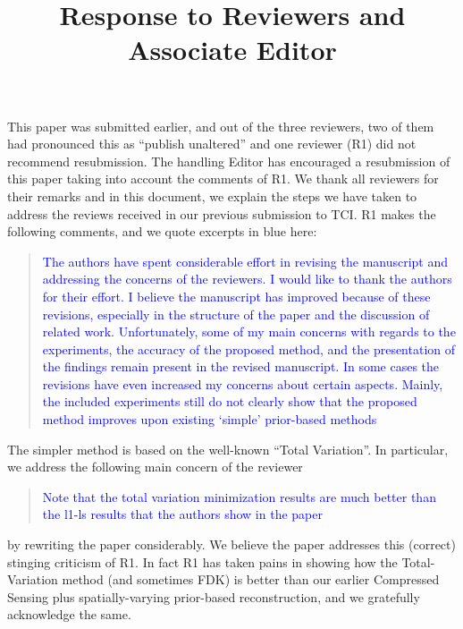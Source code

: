 \documentclass{article}
\title{Response to Reviewers and Associate Editor}
\begin{document}
\date{}
\maketitle

This paper was submitted earlier, and out of the three reviewers, two
of them had pronounced this as ``publish unaltered'' and one reviewer
(R1) did not recommend resubmission. The handling Editor has
encouraged a resubmission of this paper taking into account the
comments of R1.  We thank all reviewers for their remarks and in this
document, we explain the steps we have taken to address the reviews
received in our previous submission to TCI. R1 makes the following
comments, and we quote excerpts in blue here:
\begin{quote}
  \textcolor{blue}{The authors have spent considerable effort in revising the
  manuscript and addressing the concerns of the reviewers. I would
  like to thank the authors for their effort. I believe the manuscript
  has improved because of these revisions, especially in the structure
  of the paper and the discussion of related work. Unfortunately, some
  of my main concerns with regards to the experiments, the accuracy of
  the proposed method, and the presentation of the findings remain
  present in the revised manuscript. In some cases the revisions have
  even increased my concerns about certain aspects. Mainly, the
  included experiments still do not clearly show that the proposed
  method improves upon existing ‘simple’ prior-based methods
  }
  \end{quote}

The simpler method is based on the well-known ``Total Variation''. 
In particular, we address the following main concern of the reviewer 
\begin{quote}  
    \textcolor{blue}{Note that the total
variation minimization results are much better than the l1-ls results that the authors show in the
paper}
\end{quote}

    by rewriting the paper considerably.  We believe the paper
    addresses this (correct) stinging criticism of R1.  In fact R1 has taken
    pains in showing how the Total-Variation method (and sometimes
    FDK) is better than our earlier Compressed Sensing plus
    spatially-varying prior-based reconstruction, and we gratefully
    acknowledge the same.
\end{document}
